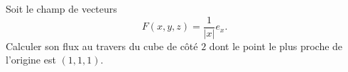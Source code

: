 
\begin{exercice}\label{exoOutilsMath-0111}

    Soit le champ de vecteurs
    \begin{equation}
        F(x,y,z)=\frac{1}{ | x | }e_x.
    \end{equation}
    Calculer son flux au travers du cube de côté $2$ dont le point le plus proche de l'origine est $(1,1,1)$.

\end{exercice}
